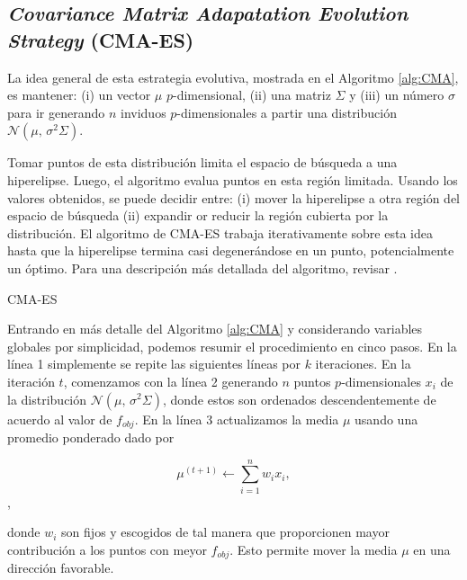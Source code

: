 \subsection{\emph{Covariance Matrix Adapatation Evolution Strategy} (CMA-ES)}

La idea general de esta estrategia evolutiva, mostrada en el Algoritmo
\ref{alg:CMA}, es mantener:
(i) un vector $\mu$ $p$-dimensional,
(ii) una matriz $\Sigma$ y
(iii) un número $\sigma$ para ir generando $n$ inviduos $p$-dimensionales
a partir una distribución $\mathcal{N}(\mu,\,\sigma^{2} \Sigma)$.


Tomar puntos de esta distribución limita el espacio de búsqueda a una
hiperelipse.
Luego, el algoritmo evalua puntos en esta región limitada.
Usando los valores obtenidos, se puede decidir entre:
(i) mover la hiperelipse a otra región del espacio de búsqueda
(ii) expandir or reducir la región cubierta por la distribución.
El algoritmo de CMA-ES trabaja iterativamente sobre esta idea hasta que la
hiperelipse termina casi degenerándose en un punto, 
potencialmente un óptimo.
Para una descripción más detallada del algoritmo, revisar \citep{Mykel2019, Hansen2016}.

\begin{algorithm}
{}
\caption{CMA-ES}
\label{alg:CMA}
\end{algorithm}

Entrando en más detalle del Algoritmo \ref{alg:CMA} y considerando variables
globales por simplicidad, podemos resumir el procedimiento en cinco pasos.
En la línea 1 simplemente se repite las siguientes líneas por $k$ iteraciones.
En la iteración $t$, comenzamos con la línea 2 generando $n$ puntos
$p$-dimensionales $x_i$ de la distribución $\mathcal{N}(\mu,\,\sigma^{2} \Sigma)$, 
donde estos son ordenados descendentemente de acuerdo
al valor de $f_{obj}$.
En la línea 3 actualizamos la media $\mu$ usando una promedio ponderado dado
por

\begin{equation}
    \mu^{(t + 1)} \gets \sum_{i=1}^{n} w_i x_i,
\label{cma-average}
\end{equation},

donde $w_i$ son fijos y escogidos de tal manera que proporcionen mayor
contribución a los puntos con meyor $f_{obj}$. Esto permite mover la media $\mu$
en una dirección favorable.

